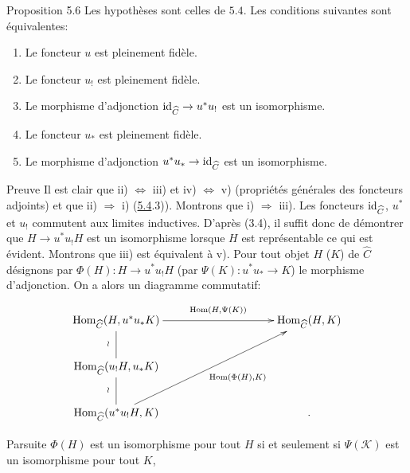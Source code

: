 \documentclass[10pt]{../fichiers-configuration-latex/smfart}
\def\labelenumi{(\theenumi)}
\begin{document}
\begin{enonce*}{Proposition 5.6}
Les hypothèses sont celles de $\hyperref[I.prop5.4]{5.4}$. Les conditions
suivantes sont équivalentes:
\begin{enumerate}
\renewcommand{\theenumi}{\roman{enumi}}
\renewcommand{\labelenumi}{\theenumi)}
\item Le foncteur $u$ est pleinement fidèle.

\item Le foncteur $u_{!}$ est pleinement fidèle.

\item Le morphisme d'adjonction
  $\operatorname{id}_{\widehat{C}}\rightarrow u^\ast u_{!}$ est un
  isomorphisme.

\item Le foncteur $u_\ast$ est pleinement fidèle.

\item Le morphisme d'adjonction $u^\ast u_\ast\rightarrow
  \operatorname{id}_{\widehat{C}}$ est un isomorphisme.
\end{enumerate}
\end{enonce*}

\begin{enonce*}[remark]{Preuve}
Il est clair que ii) $\Leftrightarrow$ iii) et iv) $\Leftrightarrow$
v) (propriétés générales des foncteurs adjoints) et que ii)
$\Rightarrow$ i) (\hyperref[I.prop5.4]{5.4}.3)). Montrons que i) $\Rightarrow$
iii). Les foncteurs $\operatorname{id}_{\widehat{C}}$, $u^\ast$ et
$u_{!}$ commutent aux limites inductives. D'après (3.4), il suffit
donc de démontrer que $H\rightarrow u^\ast u_{!} H$ est un
isomorphisme lorsque $H$ est représentable ce qui est évident.
Montrons que %
iii) est équivalent à %
v). Pour tout objet $H$ (\resp  $K$) de $\widehat{C}$
désignons par $\Phi(H):H\rightarrow u^\ast u_{!} H$ (\resp  par
$\Psi(K):u^\ast u_\ast\rightarrow K$) le morphisme d'adjonction. On
a alors un diagramme commutatif:
\[
\xymatrix@C=3.5cm@L=6pt{
\Hom_{\widehat{C}}(H,u^{\ast}u_{\ast}
K)\ar@{-}[d]_{\wr}\ar[r]^{\quad \Hom(H,\Psi(K))}   & \Hom_{\widehat{C}}(H,K)\\
\Hom_{\widehat{C}}(u_{!}H,u_{\ast}K)\ar@{-}[d]_{\wr} &  \\
\Hom_{\widehat{C}}(u^{\ast}u_{!}H,K)\ar[uru]_{\quad
   \Hom(\Phi(H),K)} & .
}
\]

Par\pageoriginale suite $\Phi(H)$ est un isomorphisme pour tout $H$
si et seulement si $\Psi(𝒦)$ est un isomorphisme pour tout
$K$, \cqfd
\end{enonce*}
\end{document}
